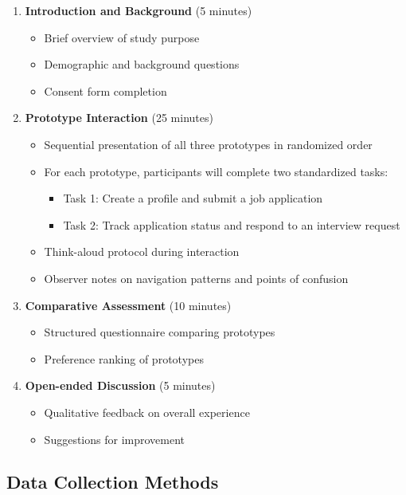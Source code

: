 \documentclass[
	letterpaper, %
]{jdf}
\begin{document}
\begin{enumerate}
    \item \textbf{Introduction and Background} (5 minutes)
    \begin{itemize}
        \item Brief overview of study purpose
        \item Demographic and background questions
        \item Consent form completion
    \end{itemize}
    
    \item \textbf{Prototype Interaction} (25 minutes)
    \begin{itemize}
        \item Sequential presentation of all three prototypes in randomized order
        \item For each prototype, participants will complete two standardized tasks:
        \begin{itemize}
            \item Task 1: Create a profile and submit a job application
            \item Task 2: Track application status and respond to an interview request
        \end{itemize}
        \item Think-aloud protocol during interaction
        \item Observer notes on navigation patterns and points of confusion
    \end{itemize}
    
    \item \textbf{Comparative Assessment} (10 minutes)
    \begin{itemize}
        \item Structured questionnaire comparing prototypes
        \item Preference ranking of prototypes
    \end{itemize}
    
    \item \textbf{Open-ended Discussion} (5 minutes)
    \begin{itemize}
        \item Qualitative feedback on overall experience
        \item Suggestions for improvement
    \end{itemize}
\end{enumerate}

\subsection{Data Collection Methods}
\end{document}
